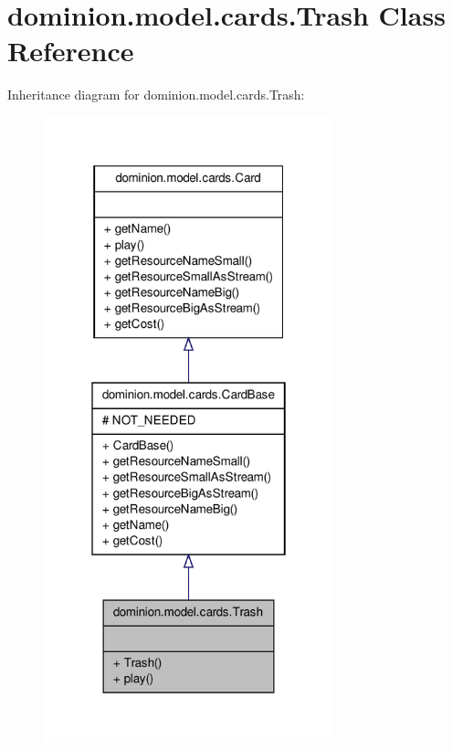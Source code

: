 \hypertarget{classdominion_1_1model_1_1cards_1_1Trash}{\section{dominion.\-model.\-cards.\-Trash \-Class \-Reference}
\label{classdominion_1_1model_1_1cards_1_1Trash}
}


\-Inheritance diagram for dominion.\-model.\-cards.\-Trash\-:
\nopagebreak
\begin{figure}[H]
\begin{center}
\leavevmode
\includegraphics[width=238pt]{classdominion_1_1model_1_1cards_1_1Trash__inherit__graph}
\end{center}
\end{figure}


